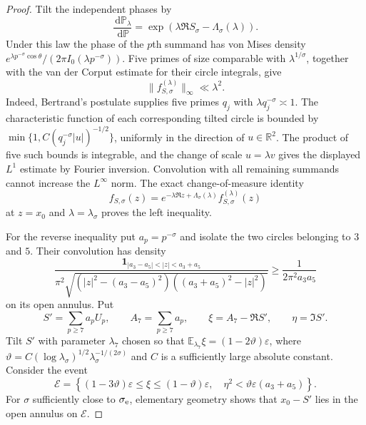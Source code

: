 \documentclass[11pt]{article}
\theoremstyle{definition}
\theoremstyle{remark}
\newcommand{\dd}{\,\mathrm d}
\newcommand{\eps}{\varepsilon}
\newcommand{\one}{\mathbf 1}
\begin{document}
\begin{proof}
Tilt the independent phases by
\[
 \frac{\dd\mathbb P_\lambda}{\dd\mathbb P}
 =\exp(\lambda\Re S_\sigma-\Lambda_\sigma(\lambda)).
\]
Under this law the phase of the $p$th summand has von Mises density
$e^{\lambda p^{-\sigma}\cos\theta}/(2\pi I_0(\lambda p^{-\sigma}))$.
Five primes of size comparable with $\lambda^{1/\sigma}$, together with the
van der Corput estimate for their circle integrals, give
\[
 \|f^{(\lambda)}_{S,\sigma}\|_\infty\ll\lambda^2.
\]
Indeed, Bertrand's postulate supplies five primes $q_j$ with
$\lambda q_j^{-\sigma}\asymp1$.  The characteristic function of each
corresponding tilted circle is bounded by
$\min\{1,C(q_j^{-\sigma}|u|)^{-1/2}\}$, uniformly in the direction of
$u\in\mathbb R^2$.  The product of five such bounds is integrable, and the
change of scale $u=\lambda v$ gives the displayed $L^1$ estimate by Fourier
inversion.  Convolution with all remaining summands cannot increase the
$L^\infty$ norm.
The exact change-of-measure identity
\[
 f_{S,\sigma}(z)=e^{-\lambda\Re z+\Lambda_\sigma(\lambda)}
 f^{(\lambda)}_{S,\sigma}(z)
\]
at $z=x_0$ and $\lambda=\lambda_\sigma$ proves the left inequality.

For the reverse inequality put $a_p=p^{-\sigma}$ and isolate the two circles
belonging to $3$ and $5$.
Their convolution has density
\[
 \frac{\one_{|a_3-a_5|<|z|<a_3+a_5}}
 {\pi^2\sqrt{(|z|^2-(a_3-a_5)^2)((a_3+a_5)^2-|z|^2)}}
 \ge \frac1{2\pi^2a_3a_5}
\]
on its open annulus.  Put
\[
 S' =\sum_{p\ge7}a_pU_p,\qquad
 A_7=\sum_{p\ge7}a_p,\qquad
 \xi=A_7-\Re S',\qquad \eta=\Im S'.
\]
Tilt $S'$ with parameter $\lambda_7$ chosen so that
$\mathbb E_{\lambda_7}\xi=(1-2\vartheta)\eps$, where
$\vartheta=C(\log\lambda_\sigma)^{1/2}\lambda_\sigma^{-1/(2\sigma)}$
and $C$ is a sufficiently large absolute constant.  Consider the event
\[
 \mathcal E=\left\{
 (1-3\vartheta)\eps\le\xi\le(1-\vartheta)\eps,
 \quad \eta^2<\vartheta\eps(a_3+a_5)
 \right\}.
\]
For $\sigma$ sufficiently close to $\sigma_{\rm e}$, elementary geometry
shows that $x_0-S'$ lies in the open annulus on $\mathcal E$.


\end{proof}
\end{document}
